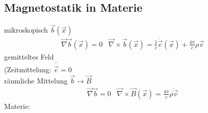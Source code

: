 \documentclass[a4paper]{article}
\begin{document}
\subsection{Magnetostatik in Materie}
mikroskopisch $\vec{b}(\vec{x})$\\
\begin{align}
\vec{\nabla}\vec{b}(\vec{x})=0 & \vec{\nabla}\times\vec{b}(\vec{x})=\frac{1}{c}
\dot{\vec{e}}(\vec{x})+\frac{4\pi}{c}\rho\vec{v}
\end{align}
gemitteltes Feld\\
(Zeitmittelung: $\bar{\dot{\vec{e}}}=0$\\
räumliche Mittelung $\vec{b}\rightarrow\vec{B}$\\
\begin{align}
\vec{\nabla}\vec{b}=0 & \vec{\nabla}\times\vec{B}(\vec{x})=\frac{4\pi}{c}\overline{\rho\vec{v}}
\end{align}
Materie:
\end{document}
